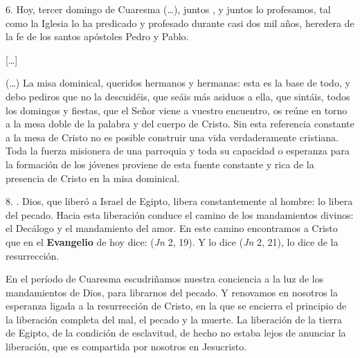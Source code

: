 \begin{body}
6. Hoy, tercer domingo de Cuaresma (\ldots), juntos , y juntos lo profesamos, tal como la Iglesia  lo ha predicado y profesado durante casi dos mil años, heredera de la fe de los santos apóstoles Pedro y Pablo.

[\ldots]

(\ldots) La misa dominical, queridos hermanos y hermanas: esta es la base de todo, y debo pediros que no la descuidéis, que seáis más asiduos a ella, que sintáis, todos los domingos y fiestas, que el Señor viene a vuestro encuentro, os reúne en torno a la mesa doble de la palabra y del cuerpo de Cristo. Sin esta referencia constante a la mesa de Cristo no es posible construir una vida verdaderamente cristiana. Toda la fuerza misionera de una parroquia y toda su capacidad o esperanza para la formación de los jóvenes proviene de esta fuente constante y rica de la presencia de Cristo en la misa dominical.


8. . Dios, que liberó a Israel de Egipto, libera constantemente al hombre: lo libera del pecado. Hacia esta liberación conduce el camino de los mandamientos divinos: el Decálogo y el mandamiento del amor. En este camino encontramos a Cristo que en el \textbf{Evangelio} de hoy dice:  (\textit{Jn} 2, 19). Y lo dice  (\textit{Jn} 2, 21), lo dice de la resurrección.

En el período de Cuaresma escudriñamos nuestra conciencia a la luz de los mandamientos de Dios, para librarnos del pecado. Y renovamos en nosotros la esperanza ligada a la resurrección de Cristo, en la que se encierra el principio de la liberación completa del mal, el pecado y la muerte. La liberación de la tierra de Egipto, de la condición de esclavitud, de hecho no estaba lejos de anunciar la liberación, que es compartida por nosotros en Jesucristo.
\end{body}

